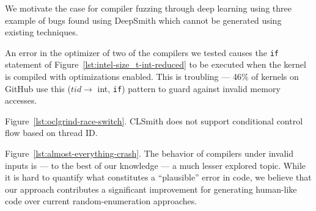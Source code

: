 We motivate the case for compiler fuzzing through deep learning using three example of bugs found using DeepSmith which cannot be generated using existing techniques.

An error in the optimizer of two of the compilers we tested
causes the \texttt{if} statement of Figure~\ref{lst:intel-size_t-int-reduced} to be executed when the kernel is compiled with optimizations enabled.
This is troubling --- 46\% of kernels on GitHub use this ($tid \rightarrow$ int, \texttt{if}) pattern to guard against invalid memory accesses.


 Figure~\ref{lst:oclgrind-race-switch}. CLSmith does not support conditional control flow based on thread ID.

 Figure~\ref{lst:almost-everything-crash}. The behavior of compilers under invalid inputs is --- to the best of our knowledge --- a much lesser explored topic. While it is hard to quantify what constitutes a ``plausible'' error in code, we believe that our approach contributes a significant improvement for generating human-like code over current random-enumeration approaches. 
